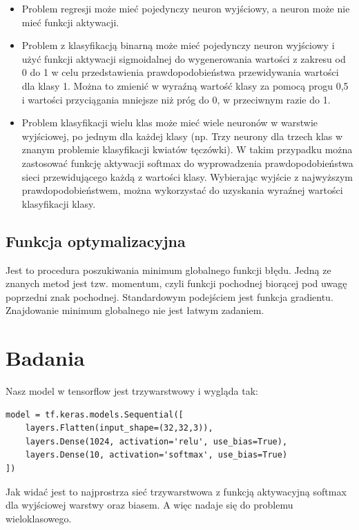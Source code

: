 \documentclass{article}
\begin{document}
\begin{itemize}
  \item Problem regresji może mieć pojedynczy neuron wyjściowy, a neuron może nie mieć funkcji aktywacji.
  \item Problem z klasyfikacją binarną może mieć pojedynczy neuron wyjściowy i użyć funkcji
  aktywacji sigmoidalnej do wygenerowania wartości z zakresu od 0 do 1 w celu przedstawienia
  prawdopodobieństwa przewidywania wartości dla klasy 1. Można to zmienić w wyraźną wartość
  klasy za pomocą progu 0,5 i wartości przyciągania mniejsze niż próg do 0, w przeciwnym razie do 1.
  \item Problem klasyfikacji wielu klas może mieć wiele neuronów w warstwie wyjściowej,
  po jednym dla każdej klasy (np. Trzy neurony dla trzech klas w znanym problemie
  klasyfikacji kwiatów tęczówki). W takim przypadku można zastosować funkcję aktywacji
  softmax do wyprowadzenia prawdopodobieństwa sieci przewidującego każdą
  z wartości klasy. Wybierając wyjście z najwyższym prawdopodobieństwem,
  można wykorzystać do uzyskania wyraźnej wartości klasyfikacji klasy.
\end{itemize}

\subsection{Funkcja optymalizacyjna}

Jest to procedura poszukiwania minimum globalnego funkcji błędu.
Jedną ze znanych metod jest tzw. momentum, czyli funkcji pochodnej biorącej pod uwagę poprzedni
znak pochodnej.
Standardowym podejściem jest funkcja gradientu. Znajdowanie minimum globalnego nie jest łatwym zadaniem.

\section{Badania}

Nasz model w tensorflow jest trzywarstwowy i wygląda tak:
\begin{lstlisting}
model = tf.keras.models.Sequential([
    layers.Flatten(input_shape=(32,32,3)),
    layers.Dense(1024, activation='relu', use_bias=True),
    layers.Dense(10, activation='softmax', use_bias=True)
])
\end{lstlisting}

Jak widać jest to najprostrza sieć trzywarstwowa z funkcją aktywacyjną softmax dla wyjściowej
warstwy oraz biasem. A więc nadaje się do problemu wieloklasowego.
\end{document}

